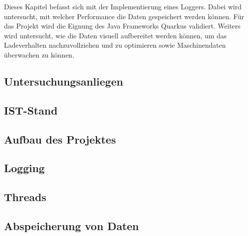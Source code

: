 Dieses Kapitel befasst sich mit der Implementierung eines Loggers. Dabei wird untersucht, mit welcher Performance die Daten gespeichert werden können. Für das Projekt wird die Eignung des Java Frameworks Quarkus validiert. Weiters wird untersucht, wie die Daten visuell aufbereitet werden können, um das Ladeverhalten nachzuvollziehen und zu optimieren sowie Maschinendaten überwachen zu können.

\begin{spacing}{1}
    \section{Untersuchungsanliegen}\label{section:untersuchungsanliegenFlexlogger}
    \end{spacing}


\begin{spacing}{1}
    \section{IST-Stand}\label{section:ist-standFlexlogger}
    \end{spacing}


\begin{spacing}{1}
    \section{Aufbau des Projektes}\label{section:aufbaudesProjektesFlexlogger}
    \end{spacing}


\begin{spacing}{1}
    \section{Logging}\label{section:logging}
    \end{spacing}


\begin{spacing}{1}
    \section{Threads}\label{section:threads}
    \end{spacing}


%

\begin{spacing}{1}
    \section{Abspeicherung von Daten}\label{section:savedata}
    \end{spacing}

